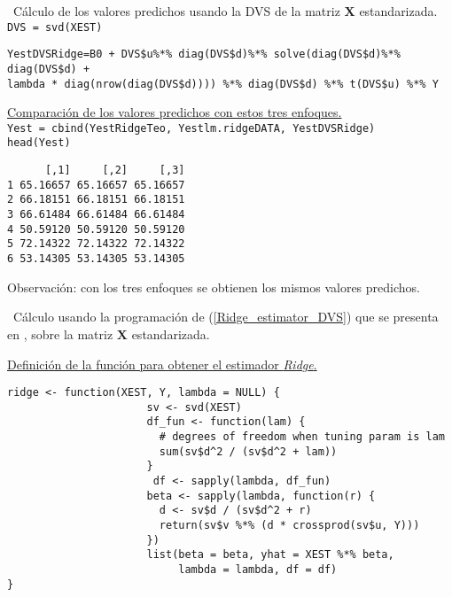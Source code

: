 \documentclass[a4paper,12pt]{report}
\begin{document}
\textbullet\ Cálculo de los valores predichos usando la DVS de la matriz $\boldsymbol{X}$ estandarizada.
\vspace{0.4cm}
\\
\texttt{DVS = svd(XEST)}

{
\begin{verbatim}
YestDVSRidge=B0 + DVS$u%*% diag(DVS$d)%*% solve(diag(DVS$d)%*% diag(DVS$d) +
lambda * diag(nrow(diag(DVS$d)))) %*% diag(DVS$d) %*% t(DVS$u) %*% Y
\end{verbatim}
}

\newpage

\underline{Comparación de los valores predichos con estos tres enfoques.}\\
\texttt{Yest = cbind(YestRidgeTeo, Yestlm.ridgeDATA, YestDVSRidge)}\\
\texttt{head(Yest)}

{
\begin{verbatim}
      [,1]     [,2]     [,3]
1 65.16657 65.16657 65.16657
2 66.18151 66.18151 66.18151
3 66.61484 66.61484 66.61484
4 50.59120 50.59120 50.59120
5 72.14322 72.14322 72.14322
6 53.14305 53.14305 53.14305
\end{verbatim}
}
Observación: con los tres enfoques se obtienen los mismos valores predichos.

\vspace{0.5cm}

\textbullet\ Cálculo usando la programación de (\ref{Ridge_estimator_DVS}) que se presenta en \citet{bien2016simulator}, sobre la matriz $\boldsymbol{X}$ estandarizada.
\vspace{0.4cm}

\underline{Definición de la función para obtener el estimador \textit{Ridge}.}

{
\begin{verbatim}
ridge <- function(XEST, Y, lambda = NULL) {
                      sv <- svd(XEST)
                      df_fun <- function(lam) {
                        # degrees of freedom when tuning param is lam
                        sum(sv$d^2 / (sv$d^2 + lam))
                      }
                       df <- sapply(lambda, df_fun)
                      beta <- sapply(lambda, function(r) {
                        d <- sv$d / (sv$d^2 + r)
                        return(sv$v %*% (d * crossprod(sv$u, Y)))
                      })
                      list(beta = beta, yhat = XEST %*% beta,
                           lambda = lambda, df = df)
}
\end{verbatim}
}
\end{document}
